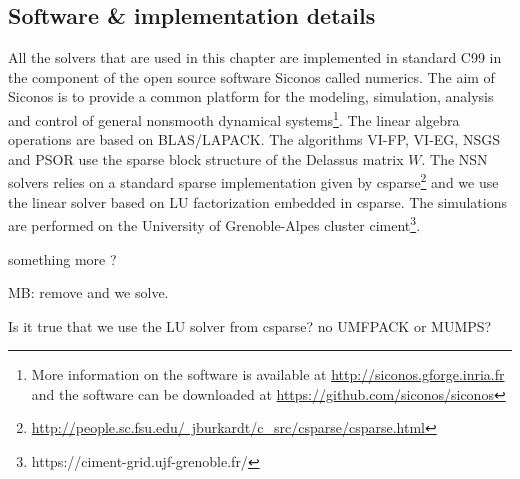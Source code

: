 

\subsection{Software \& implementation details}

All the solvers that are used in this chapter are implemented in standard C99 in the component of the open source software Siconos called numerics. The aim of Siconos is to provide a common platform for the modeling, simulation, analysis and control of general nonsmooth dynamical systems\footnote{More information on the software is available at \href{http://siconos.gforge.inria.fr}{http://siconos.gforge.inria.fr} and the software can be downloaded at  \href{https://github.com/siconos/siconos}{https://github.com/siconos/siconos}}. The linear algebra operations are based on BLAS/LAPACK. The algorithms {\sf VI-FP}, {\sf VI-EG}, {\sf NSGS} and {\sf PSOR} use the sparse block structure of the Delassus matrix $W$. The {\sf NSN} solvers relies on a standard sparse implementation given by csparse\footnote{\href{http://people.sc.fsu.edu/~jburkardt/c_src/csparse/csparse.html}{http://people.sc.fsu.edu/~jburkardt/c\_src/csparse/csparse.html}} and we use the linear solver based on LU factorization embedded in csparse. The simulations are performed on the University of Grenoble-Alpes cluster {\sc ciment}\footnote{https://ciment-grid.ujf-grenoble.fr/}.





\begin{ndrva}
  something more ?

  MB: remove and we solve. 

  Is it true that we use the LU solver from csparse? no UMFPACK or MUMPS?
\end{ndrva}

